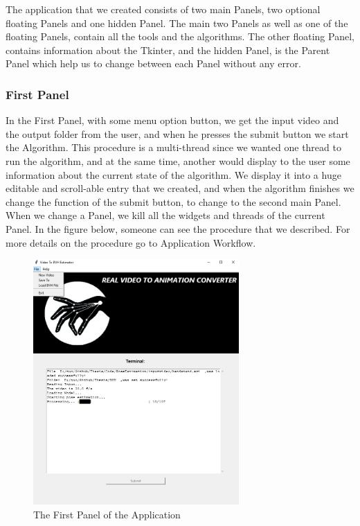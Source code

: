 The application that we created consists of two main Panels, two optional floating Panels and one hidden Panel. The main two Panels as well as one of the floating Panels, contain all the tools and the algorithms. The other floating Panel, contains information about the Tkinter, and the hidden Panel, is the Parent Panel which help us to change between each Panel without any error.

\subsubsection*{First Panel}
In the First Panel, with some menu option button, we get the input video and the output folder from the user, and when he presses the submit button we start the Algorithm. This procedure is a multi-thread since we wanted one thread to run the algorithm, and at the same time, another would display to the user some information about the current state of the algorithm. We display it into a huge editable and scroll-able entry that we created, and when the algorithm finishes we change the function of the submit button, to change to the second main Panel. When we change a Panel, we kill all the widgets and threads of the current Panel. In the figure below, someone can see the procedure that we described. For more details on the procedure go to Application Workflow. 

\begin{figure}[h]
	\centering
	\includegraphics[width=0.7\textwidth]{figures/Implementation/Panel1.png}
	\captionsetup{labelformat=empty}
	\caption{The First Panel of the Application}
\end{figure}

